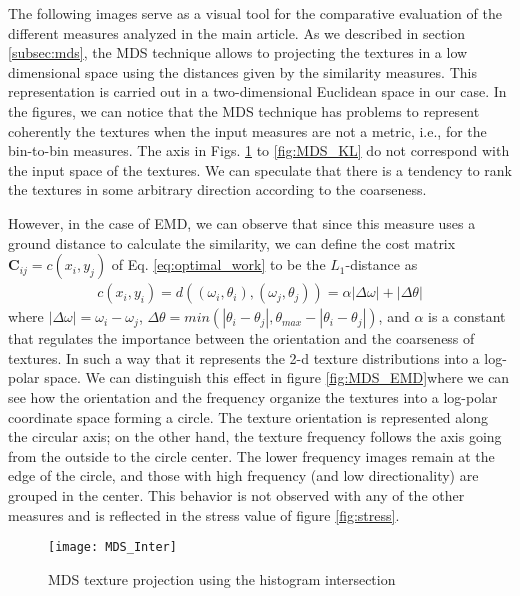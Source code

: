 The following images serve as a visual tool for the comparative evaluation of the different measures analyzed in the main article. As we described in section \ref{subsec:mds}, the MDS technique allows to projecting the textures in a low dimensional space using the distances given by the similarity measures. This representation is carried out in a two-dimensional Euclidean space in our case. In the figures, we can notice that the MDS technique has problems to represent coherently the textures when the input measures are not a metric, i.e., for the bin-to-bin measures. The axis in  Figs. \ref{fig:MDS_Inter} to \ref{fig:MDS_KL} do not correspond with the input space of the textures. We can speculate that there is a tendency to rank the textures in some arbitrary direction according to the coarseness.

However, in the case of EMD, we can observe that since this measure uses a ground distance to calculate the similarity, we can define the cost matrix $\mathbf{C}_{ij} = c(x_i, y_j)$ of Eq. \ref{eq:optimal_work} to be the $L_1$-distance as
\begin{eqnarray} 
 c(x_i, y_i) = d((\omega_i, \theta_i), (\omega_j, \theta_j))=\alpha|\Delta \omega| + |\Delta \theta| \label{eq:ground_distance}
\end{eqnarray}
where $|\Delta \omega| = \omega_i - \omega_j$, $\Delta \theta=min(|\theta_i-\theta_j|, \theta_{max} - |\theta_i-\theta_j|)$, and $\alpha$ is a constant that regulates the importance between the orientation and the coarseness of textures. In such a way that it represents the 2-d texture distributions into a log-polar space. We can distinguish this effect in figure \ref{fig:MDS_EMD}where we can see how the orientation and the frequency organize the textures into a log-polar coordinate space forming a circle. The texture orientation is represented along the circular axis; on the other hand, the texture frequency follows the axis going from the outside to the circle center. The lower frequency images remain at the edge of the circle, and those with high frequency (and low directionality) are grouped in the center. This behavior is not observed with any of the other measures and is reflected in the stress value of figure \ref{fig:stress}.

\begin{figure}[!ht]
 \centering    
 \texttt{[image: MDS\_Inter]}
 \caption{MDS texture projection using the histogram intersection}
 \label{fig:MDS_Inter} 
\end{figure}

